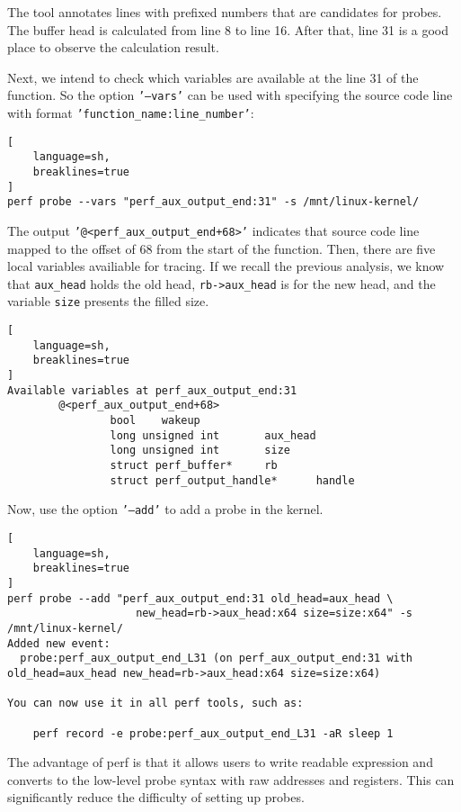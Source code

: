 \documentclass[11pt]{diazessay} %
\def\code#1{\texttt{#1}}
\begin{document}
The tool annotates lines with prefixed numbers that are candidates for probes.
The buffer head is calculated from line 8 to line 16. After that, line 31 is a
good place to observe the calculation result.

Next, we intend to check which variables are available at the line 31 of the
function. So the option \code{'---vars'} can be used with specifying the
source code line with format \code{'function\_name:line\_number'}:

\begin{lstlisting}[
  	language=sh,
	breaklines=true
]
perf probe --vars "perf_aux_output_end:31" -s /mnt/linux-kernel/
\end{lstlisting}

The output \code{'@<perf\_aux\_output\_end+68>'} indicates that source code
line mapped to the offset of 68 from the start of the function. Then, there
are five local variables availiable for tracing. If we recall the previous
analysis, we know that \code{aux\_head} holds the old head,
\code{rb->aux\_head} is for the new head, and the variable \code{size}
presents the filled size.

\begin{lstlisting}[
  	language=sh,
	breaklines=true
]
Available variables at perf_aux_output_end:31
        @<perf_aux_output_end+68>
                bool    wakeup
                long unsigned int       aux_head
                long unsigned int       size
                struct perf_buffer*     rb
                struct perf_output_handle*      handle
\end{lstlisting}

Now, use the option \code{'---add'} to add a probe in the kernel.

\begin{lstlisting}[
  	language=sh,
	breaklines=true
]
perf probe --add "perf_aux_output_end:31 old_head=aux_head \
                    new_head=rb->aux_head:x64 size=size:x64" -s /mnt/linux-kernel/
Added new event:
  probe:perf_aux_output_end_L31 (on perf_aux_output_end:31 with old_head=aux_head new_head=rb->aux_head:x64 size=size:x64)

You can now use it in all perf tools, such as:

	perf record -e probe:perf_aux_output_end_L31 -aR sleep 1
\end{lstlisting}

The advantage of perf is that it allows users to write readable expression and
converts to the low-level probe syntax with raw addresses and registers. This
can significantly reduce the difficulty of setting up probes.
\end{document}
